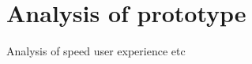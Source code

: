 \chapter{Analysis of prototype} %

\label{ch:analysisofprototype} %
Analysis of speed user experience etc